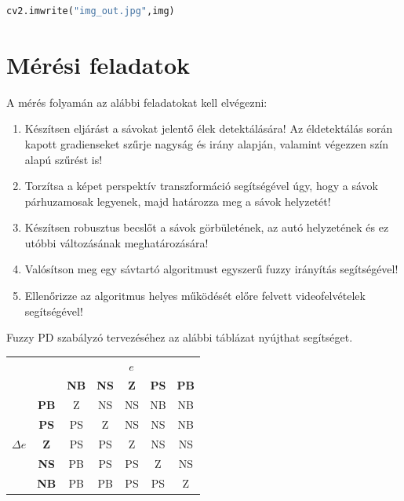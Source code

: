 \documentclass[12pt,a4paper,oneside]{report}             %
\begin{document}
\begin{lstlisting}[language=Python]
cv2.imwrite("img_out.jpg",img)
\end{lstlisting}

\chapter{Mérési feladatok}

A mérés folyamán az alábbi feladatokat kell elvégezni:

\begin{enumerate}
\item Készítsen eljárást a sávokat jelentő élek detektálására! Az éldetektálás során kapott gradienseket szűrje nagyság és irány alapján, valamint végezzen szín alapú szűrést is!
\item Torzítsa a képet perspektív transzformáció segítségével úgy, hogy a sávok párhuzamosak legyenek, majd határozza meg a sávok helyzetét!
\item Készítsen robusztus becslőt a sávok görbületének, az autó helyzetének és ez utóbbi változásának meghatározására!
\item Valósítson meg egy sávtartó algoritmust egyszerű fuzzy irányítás segítségével!
\item Ellenőrizze az algoritmus helyes működését előre felvett videofelvételek segítségével!
\end{enumerate}

Fuzzy PD szabályzó tervezéséhez az alábbi táblázat nyújthat segítséget.

\begin{table}[!htb]
	\centering
	\begin{tabular}{c | c || c | c | c | c | c |}
		\multicolumn{3}{c}{}	  & \multicolumn{3}{c}{$e$} & \multicolumn{1}{c}{} \\ \cline{2-7}
							& 		  & \textbf{NB} & \textbf{NS} & \textbf{Z} & \textbf{PS} & \textbf{PB} \\ \hhline{~======}
							& \textbf{PB} 	& Z & NS & NS & NB & NB \\ \cline{2-7} 
							& \textbf{PS}	& PS & Z & NS & NS & NB \\ \cline{2-7} 
		$\Delta e$ 	 & \textbf{Z}     & PS & PS & Z & NS & NS \\ \cline{2-7} 
							& \textbf{NS}	& PB & PS & PS & Z & NS \\ \cline{2-7} 
							& \textbf{NB}	& PB & PB & PS & PS & Z \\ \cline{2-7} 
	\end{tabular}
\end{table}
\end{document}
